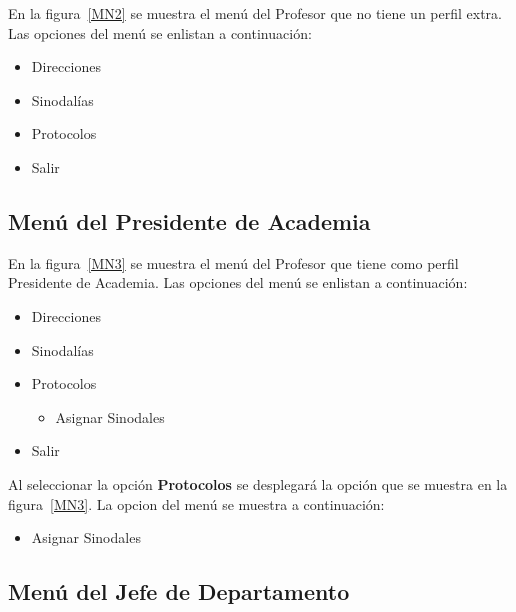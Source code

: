 	En la figura~\ref{MN2} se muestra el menú del Profesor que no tiene un perfil extra. Las opciones del menú se enlistan a continuación:
	\begin{itemize}
		\item Direcciones
		\item Sinodalías
		\item Protocolos
		\item Salir
	\end{itemize}



\subsection{Menú del Presidente de Academia}

	En la figura~\ref{MN3} se muestra el menú del Profesor que tiene como perfil Presidente de Academia. Las opciones del menú se enlistan a continuación:
	\begin{itemize}
		\item Direcciones
		\item Sinodalías
		\item Protocolos
		\begin{itemize}
			\item Asignar Sinodales
		\end{itemize}
		\item Salir
	\end{itemize}
	
	
	
	Al seleccionar la opción \textbf{Protocolos} se desplegará la opción que se muestra en la figura~\ref{MN3}. La opcion del menú se muestra a continuación:
	\begin{itemize}
		\item Asignar Sinodales
	\end{itemize}

	
\subsection{Menú del Jefe de Departamento}

